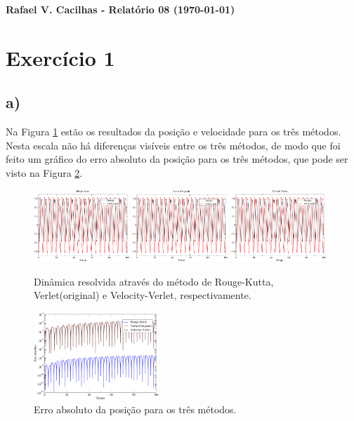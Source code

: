 \documentclass[a4wide]{report}
\begin{document}
\noindent
{\bf Rafael V. Cacilhas  - Relatório 08 (\today)}

\vspace{0.5cm}

\section*{Exercício 1}

\subsection*{a) }
Na Figura \ref{dinamica} estão os resultados da posição e velocidade para os três métodos. Nesta escala não há diferenças visíveis entre os três métodos, de modo que foi feito um gráfico do erro absoluto da posição para os três métodos, que pode ser visto na Figura \ref{4}.

\begin{figure}[!htb]
\centering
\includegraphics[width=0.32\textwidth]{xevrk.pdf}
\includegraphics[width=0.32\textwidth]{xevvO.pdf}
\includegraphics[width=0.32\textwidth]{xevVerletV.pdf}
\caption{Dinâmica resolvida através do método de Rouge-Kutta, Verlet(original) e Velocity-Verlet, respectivamente.}
\label{dinamica}
\end{figure}



\begin{figure}[!htb]
\centering
\includegraphics[width=0.42\textwidth]{erro.pdf}
\caption{Erro absoluto da posição para os três métodos.}
\label{4}
\end{figure}
\end{document}
